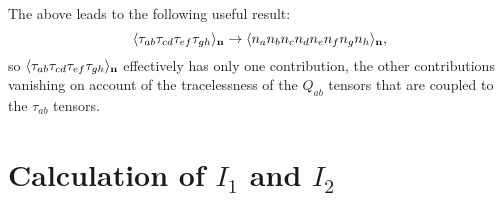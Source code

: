 \documentclass[jcp,aps,twocolumn,showpacs,supergroupedaddress,epsfig,amsmath,amssymb,eqsecnum]{revtex4}
\newcommand{\be}{\begin{equation}}
\newcommand{\ee}{\end{equation}}
\newcommand{\ea}{\end{eqnarray}}
\begin{document}
\begin{comment}
&&\qquad\,
+
\delta_{bg} (\delta_{ce}\delta_{dh} + \delta_{ch}\delta_{de})
+
\delta_{bh} (\delta_{ce}\delta_{dg} + \delta_{cg}\delta_{de})
\big]
\nonumber\\
&&\quad\,\,\,+
\delta_{ag}
\big[ 
\delta_{bc} (\delta_{de}\delta_{fh} + \delta_{df}\delta_{eh})
+
\delta_{bd} (\delta_{ce}\delta_{fh} + \delta_{cf}\delta_{eh})
\nonumber\\
&&\qquad\,
+
\delta_{be} (\delta_{cf}\delta_{dh} + \delta_{ch}\delta_{df})
+
\delta_{bf} (\delta_{ce}\delta_{dh} + \delta_{ch}\delta_{de})
\nonumber\\
&&\qquad\,
+
\delta_{bh} (\delta_{ce}\delta_{df} + \delta_{cf}\delta_{de})
\big]
\nonumber\\
&&\quad\,\,\,+
\delta_{ah}
\big[ 
\delta_{bc} (\delta_{de}\delta_{fg} + \delta_{df}\delta_{eg})
+
\delta_{bd} (\delta_{ce}\delta_{fg} + \delta_{cf}\delta_{eg})
\nonumber\\
&&\qquad\,
+
\delta_{be} (\delta_{cf}\delta_{dg} + \delta_{cg}\delta_{df})
+
\delta_{bf} (\delta_{ce}\delta_{dg} + \delta_{cg}\delta_{de})
\nonumber\\
&&\qquad\,
+
\delta_{bg} (\delta_{ce}\delta_{df} + \delta_{cf}\delta_{de})
\big]
\big\}
\nonumber
\ea
\end{comment}
The above leads to the following useful result: 
\be
\langle \tau_{ab}\tau_{cd}\tau_{ef}\tau_{gh} \rangle_{\bf n} 
\rightarrow
\langle
n_a n_b n_c n_d n_e n_f n_g n_h
\rangle_{\bf n},   
\ee
so $\langle \tau_{ab}\tau_{cd}\tau_{ef}\tau_{gh} \rangle_{\bf n}$ effectively has only one contribution, the other contributions vanishing on account of the tracelessness of the $Q_{ab}$ tensors that are coupled to the $\tau_{ab}$ tensors. 

\section{Calculation of $I_1$ and $I_2$}
\label{app:calc}
\end{document}
